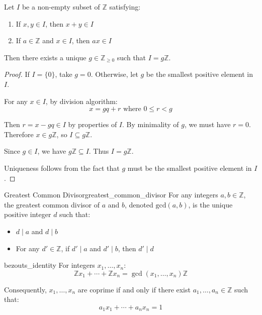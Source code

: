 \documentclass[11pt,lang=en]{elegantbook}
\begin{document}
\begin{lemma}
  Let $I$ be a non-empty subset of $\mathbb{Z}$ satisfying:
  \begin{enumerate}
    \item If $x,y \in I$, then $x + y \in I$
    \item If $a \in \mathbb{Z}$ and $x \in I$, then $ax \in I$
  \end{enumerate}
  Then there exists a unique $g \in \mathbb{Z}_{\geq 0}$ such that $I = g\mathbb{Z}$.
\end{lemma}

\begin{proof}
  If $I = \{0\}$, take $g = 0$. Otherwise, let $g$ be the smallest positive element in $I$.

  For any $x \in I$, by division algorithm:
  \[
    x = gq + r \text{ where } 0 \leq r < g
  \]

  Then $r = x - gq \in I$ by properties of $I$. By minimality of $g$, we must have $r = 0$.
  Therefore $x \in g\mathbb{Z}$, so $I \subseteq g\mathbb{Z}$.

  Since $g \in I$, we have $g\mathbb{Z} \subseteq I$. Thus $I = g\mathbb{Z}$.

  Uniqueness follows from the fact that $g$ must be the smallest positive element in $I$.
\end{proof}

\begin{definition}{Greatest Common Divisor}{greatest_common_divisor}
  For any integers $a,b \in \mathbb{Z}$, the greatest common divisor of $a$ and $b$, denoted $\text{gcd}(a,b)$, is the unique positive integer $d$ such that:
  \begin{itemize}
    \item $d \mid a$ and $d \mid b$
    \item For any $d' \in \mathbb{Z}$, if $d' \mid a$ and $d' \mid b$, then $d' \mid d$
  \end{itemize}
\end{definition}

\begin{proposition}{bezouts_identity}
  For integers $x_1,\ldots,x_n$:
  \[
    \mathbb{Z}x_1 + \cdots + \mathbb{Z}x_n = \gcd(x_1,\ldots,x_n)\mathbb{Z}
  \]

  Consequently, $x_1,\ldots,x_n$ are coprime if and only if there exist $a_1,\ldots,a_n \in \mathbb{Z}$ such that:
  \[
    a_1x_1 + \cdots + a_nx_n = 1
  \]
\end{proposition}
\end{document}
